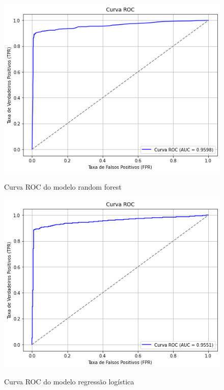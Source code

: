 \documentclass[10pt, conference, compsocconf]{IEEEtran}
\begin{document}
\begin{figure}[htbp]
  \centering
  \begin{minipage}{0.2\textwidth} 
    \centering
    \includegraphics[width=\textwidth]{roc_rf.png} 
    \tiny{\caption{Curva ROC do modelo random forest}}
    \label{fig:Curva ROC do modelo random forest}
  \end{minipage}
  \hfill 
  \begin{minipage}{0.2\textwidth}
    \centering
    \includegraphics[width=\textwidth]{roc_rl.png}
    \tiny{\caption{Curva ROC do modelo regressão logística}}
    \label{fig:Curva ROC do modelo regressão logística}
  \end{minipage}
  \label{fig:exemplo}
\end{figure}
\end{document}
